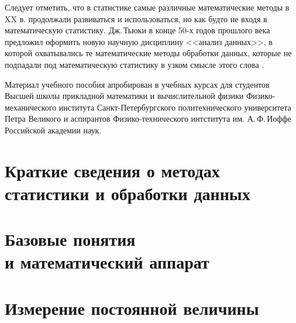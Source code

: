 \documentclass[a5paper,openany]{book}
\begin{document}
{{Следует отметить, что в статистике самые различные математические методы в XX в. продолжали развиваться и использоваться, но как будто не входя в математическую статистику. Дж.\,Тьюки в конце 50-х годов прошлого века предложил оформить 
новую научную дисциплину <<анализ данных>>, в которой 
охватывались те математические методы обработки данных, которые не подпадали 
под математическую статистику в узком смысле этого слова \cite{Tukey1962}.


Материал учебного пособия апробирован в учебных курсах для студентов  
Высшей школы прикладной математики и вычислительной физики
 Физико-механического института Санкт-Петербургского политехнического университета Петра Великого
 и аспирантов Физико-технического интститута им. А.\,Ф.\,Иоффе Российской академии наук.
 

\chapter[Краткие сведения о методах статистики и обработки данных]%
{Краткие сведения о методах статистики и обработки данных}


	\chapter[Базовые понятия и математический аппарат]%
{Базовые понятия\\ и  математический аппарат} 
\label{PrimaryConceptChap} 



	\chapter{Измерение постоянной величины} \label{MeasrConstChap}





%


	
\raggedright\small\printindex   

}}
\end{document}
